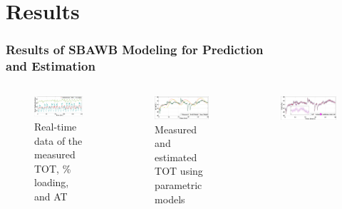 \documentclass[10pt,hyperref={pdfpagelabels=false}]{beamer}
\begin{document}
\section{Results}
\begin{frame}[fragile]
\frametitle{Results of SBAWB Modeling for Prediction\\ and Estimation}
\begin{columns}
\begin{figure}
    \centering
    \includegraphics[scale=0.23]{Images/Amb_real_NEW_8Pages_OL.png}
    \caption{Real-time data of the measured TOT, \% loading, and AT}
    \label{fig:Problem_5_1_1}
\end{figure}
\begin{figure}
    \centering
    \includegraphics[scale=0.2]{Images/SUSA_SWIFT_comparison_OL.png}
    \caption{Measured and estimated TOT  using parametric models}
    \label{fig:Problem_5_1_1}
\end{figure}
\begin{figure}
    \centering
    \includegraphics[scale=0.18]{Images/Gp_real-time_1000_OL.png}

\end{figure}
\end{columns}
\end{frame}
\end{document}

